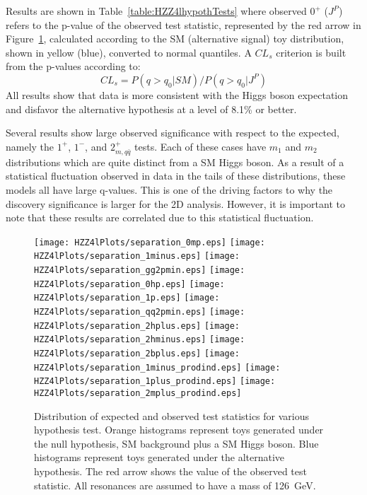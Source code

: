 Results are shown in 
Table~\ref{table:HZZ4lhypothTests} 
where observed $0^+$ ($J^P$) refers to the p-value 
of the observed test statistic, represented by the red arrow
in Figure~\ref{fig:HZZ4lhypothTests},
calculated according to the SM (alternative signal) toy 
distribution, shown in yellow (blue), converted to normal 
quantiles.  A $CL_s$ criterion is built from the p-values 
according to:
\begin{equation}
CL_s = P(q>q_0|SM)/P(q>q_0|J^P)
\end{equation}  
All results show that data is more consistent with 
the Higgs boson expectation and disfavor the alternative hypothesis
at a level of 8.1\% or better.  

Several results show large observed significance with respect to 
the expected, namely the $1^+$, $1^-$, and $2_{m,q\bar{q}}^+$ tests.
Each of these cases have $m_{1}$ and $m_{2}$ distributions which 
are quite distinct from a SM Higgs boson.  As a result of a 
statistical
fluctuation observed in data in the tails of these distributions,
these models all have large q-values.  This is one of the driving
factors to why the discovery significance is larger for the 
2D analysis. However, it is important
to note that these results are correlated due to this statistical
fluctuation.

\begin{figure}
\begin{center}
\texttt{[image: HZZ4lPlots/separation\_0mp.eps]}
\texttt{[image: HZZ4lPlots/separation\_1minus.eps]}
\texttt{[image: HZZ4lPlots/separation\_gg2pmin.eps]}
\texttt{[image: HZZ4lPlots/separation\_0hp.eps]}
\texttt{[image: HZZ4lPlots/separation\_1p.eps]}
\texttt{[image: HZZ4lPlots/separation\_qq2pmin.eps]}
\texttt{[image: HZZ4lPlots/separation\_2hplus.eps]}
\texttt{[image: HZZ4lPlots/separation\_2hminus.eps]}
\texttt{[image: HZZ4lPlots/separation\_2bplus.eps]}
\texttt{[image: HZZ4lPlots/separation\_1minus\_prodind.eps]}
\texttt{[image: HZZ4lPlots/separation\_1plus\_prodind.eps]}
\texttt{[image: HZZ4lPlots/separation\_2mplus\_prodind.eps]}
\caption{Distribution of expected and observed test statistics 
for various hypothesis test.  Orange histograms represent toys
generated under the null hypothesis, SM background plus a SM 
Higgs boson.  Blue histograms represent toys generated under the
alternative hypothesis.  The red arrow shows the value of the 
observed test statistic.  All resonances are assumed to have a 
mass of 126~GeV.}
\label{fig:HZZ4lhypothTests}
\end{center}
\end{figure}

